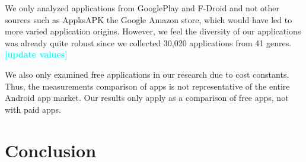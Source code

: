\documentclass[conference]{IEEEtran}
\newcommand{\todo}[1]{\textcolor{cyan}{\textbf{[#1]}}}
\begin{document}
We only analyzed applications from GooglePlay and F-Droid and not other sources such as AppksAPK the Google Amazon store, which would have led to more varied application origins. However, we feel the diversity of our applications was already quite robust since we collected 30,020 applications from 41 genres.\todo{update values}

We also only examined free applications in our research due to cost constants. Thus, the measurements comparison of apps is not representative of the entire Android app market. Our results only apply as a comparison of free apps, not with paid apps.





\section{Conclusion}
\label{sec: conclusion}


\balance



\end{document}

